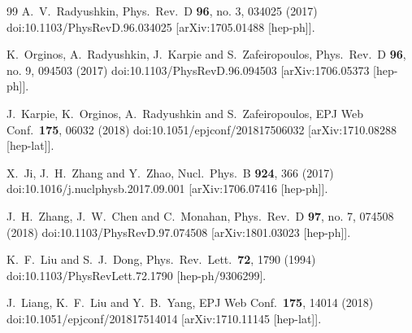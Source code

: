 \begin{thebibliography}{99}
  A.~V.~Radyushkin,
  Phys.\ Rev.\ D {\bf 96}, no. 3, 034025 (2017)
  doi:10.1103/PhysRevD.96.034025
  [arXiv:1705.01488 [hep-ph]].


  K.~Orginos, A.~Radyushkin, J.~Karpie and S.~Zafeiropoulos,
  Phys.\ Rev.\ D {\bf 96}, no. 9, 094503 (2017)
  doi:10.1103/PhysRevD.96.094503
  [arXiv:1706.05373 [hep-ph]].


  J.~Karpie, K.~Orginos, A.~Radyushkin and S.~Zafeiropoulos,
  EPJ Web Conf.\  {\bf 175}, 06032 (2018)
  doi:10.1051/epjconf/201817506032
  [arXiv:1710.08288 [hep-lat]].


  X.~Ji, J.~H.~Zhang and Y.~Zhao,
  Nucl.\ Phys.\ B {\bf 924}, 366 (2017)
  doi:10.1016/j.nuclphysb.2017.09.001
  [arXiv:1706.07416 [hep-ph]].


  J.~H.~Zhang, J.~W.~Chen and C.~Monahan,
  Phys.\ Rev.\ D {\bf 97}, no. 7, 074508 (2018)
  doi:10.1103/PhysRevD.97.074508
  [arXiv:1801.03023 [hep-ph]].


  K.~F.~Liu and S.~J.~Dong,
  Phys.\ Rev.\ Lett.\  {\bf 72}, 1790 (1994)
  doi:10.1103/PhysRevLett.72.1790
  [hep-ph/9306299].


  J.~Liang, K.~F.~Liu and Y.~B.~Yang,
  EPJ Web Conf.\  {\bf 175}, 14014 (2018)
  doi:10.1051/epjconf/201817514014
  [arXiv:1710.11145 [hep-lat]].



\end{thebibliography}
